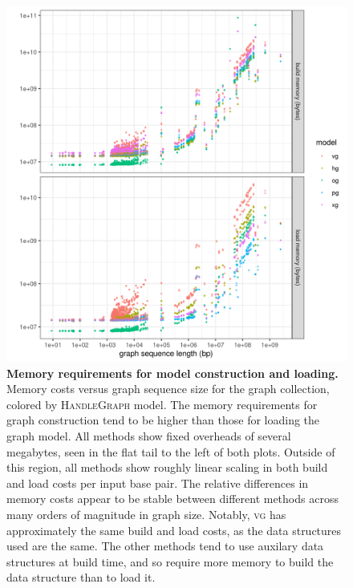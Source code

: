\documentclass{article}
\begin{document}
\begin{figure}
  \centering
  \includegraphics[width=1.0\textwidth]{figures/build_and_load_memory.png}
  \caption{
    \label{fig:prof1}
    \textbf{Memory requirements for model construction and loading.}
    Memory costs versus graph sequence size for the graph collection, colored by \textsc{HandleGraph} model.
    The memory requirements for graph construction tend to be higher than those for loading the graph model.
    All methods show fixed overheads of several megabytes, seen in the flat tail to the left of both plots.
    Outside of this region, all methods show roughly linear scaling in both build and load costs per input base pair.
    The relative differences in memory costs appear to be stable between different methods across many orders of magnitude in graph size.
    Notably, \textsc{vg} has approximately the same build and load costs, as the data structures used are the same.
    The other methods tend to use auxilary data structures at build time, and so require more memory to build the data structure than to load it.
    }
\end{figure}
\end{document}
